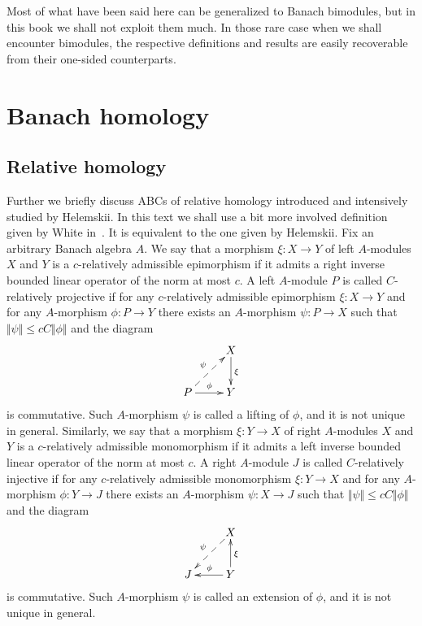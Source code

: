 Most of what have been said here can be generalized to Banach bimodules, but in
this book we shall not exploit them much. In those rare case when we shall
encounter bimodules, the respective definitions and results are easily
recoverable from their one-sided counterparts.


\section{
  Banach homology}\label{SectionBanachHomology}


\subsection{
  Relative homology}\label{SubSectionRelativeHomology}

Further we briefly discuss ABCs of relative homology introduced and intensively
studied by Helemskii. In this text we shall use a bit more involved
definition given by White in~\cite{WhiteInjmoduAlg}. It is equivalent to the one
given by Helemskii. Fix an arbitrary Banach algebra $A$. We say that a
morphism $\xi:X\to Y$ of left $A$-modules $X$ and $Y$ is a $c$-relatively 
admissible epimorphism if it admits a right inverse bounded linear operator of 
the norm at most $c$. A left $A$-module $P$ is called $C$-relatively projective 
if for any $c$-relatively admissible epimorphism $\xi:X\to Y$ and 
for any  $A$-morphism $\phi:P\to Y$ there exists 
an $A$-morphism $\psi:P\to X$ such 
that $\Vert \psi\Vert\leq cC\Vert \phi\Vert$ and the diagram
$$
\xymatrix{
& {X} \ar[d]^{\xi}\\  %
{P} \ar@{-->}[ur]^{\psi} \ar[r]^{\phi} &{Y}}  %
$$
is commutative. Such $A$-morphism $\psi$ is called a lifting of $\phi$, and it is
not unique in general. Similarly,  we say that a morphism $\xi:Y\to X$ of right
$A$-modules $X$ and $Y$ is a $c$-relatively admissible monomorphism if it admits
a left inverse bounded linear operator of the norm at most $c$. A right 
$A$-module $J$ is called $C$-relatively injective if for any $c$-relatively 
admissible monomorphism $\xi:Y\to X$ and for 
any $A$-morphism $\phi:Y\to J$ there exists an $A$-morphism $\psi:X\to J$ such 
that $\Vert\psi\Vert\leq cC\Vert\phi\Vert$ and the diagram
$$
\xymatrix{
& {X} \ar@{-->}[dl]_{\psi} \\  %
{J} &{Y} \ar[l]_{\phi} \ar[u]_{\xi}}  %
$$
is commutative. Such $A$-morphism $\psi$ is called an extension of $\phi$, and it
is not unique in general.

